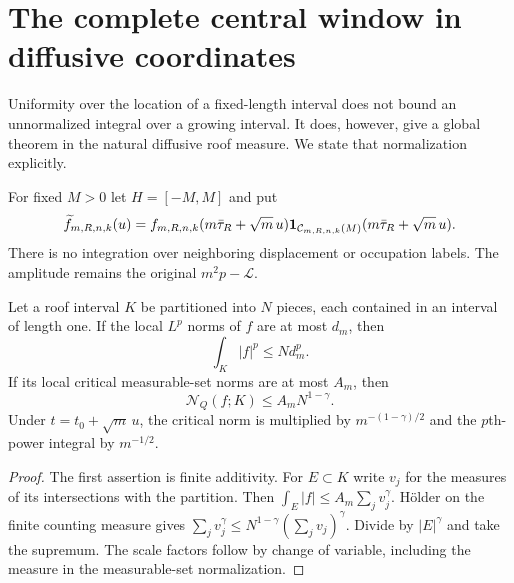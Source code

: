 \section{The complete central window in diffusive coordinates}
\label{sec:v89-global-window}
Uniformity over the location of a fixed-length interval does not
bound an unnormalized integral over a growing interval. It does,
however, give a global theorem in the natural diffusive roof measure.
We state that normalization explicitly.

For fixed $M>0$ let $H=[-M,M]$ and put
\begin{equation}\label{eq:v89-rescaled-error}
 \widetilde f_{m,R,n,k}(u)
 =f_{m,R,n,k}(m\bar\tau_R+\sqrt m\,u)
   \one_{\mathcal C_{m,R,n,k}(M)}(m\bar\tau_R+\sqrt m\,u).
\end{equation}
There is no integration over neighboring displacement or occupation
labels. The amplitude remains the original $m^2p-\mathcal L$.

\begin{lemma}
\label{lem:v89-gluing}
Let a roof interval $K$ be partitioned into $N$ pieces, each contained
in an interval of length one. If the local $L^p$ norms of $f$ are
at most $d_m$, then
\[
             \int_K|f|^p\le N d_m^p.
\]
If its local critical measurable-set norms are at most $A_m$, then
\begin{equation}\label{eq:v89-gluing}
              \mathcal N_Q(f;K)\le A_m N^{1-\gamma}.
\end{equation}
Under $t=t_0+\sqrt m\,u$, the critical norm is multiplied by
$m^{-(1-\gamma)/2}$ and the $p$th-power integral by $m^{-1/2}$.
\end{lemma}
\begin{proof}
The first assertion is finite additivity. For $E\subset K$ write
$v_j$ for the measures of its intersections with the partition.
Then $\int_E|f|\le A_m\sum_jv_j^\gamma$.
H\"older on the finite counting measure gives
$\sum_jv_j^\gamma\le N^{1-\gamma}(\sum_jv_j)^\gamma$.
Divide by $|E|^\gamma$ and take the supremum. The scale factors
follow by change of variable, including the measure in the
measurable-set normalization.
\end{proof}

